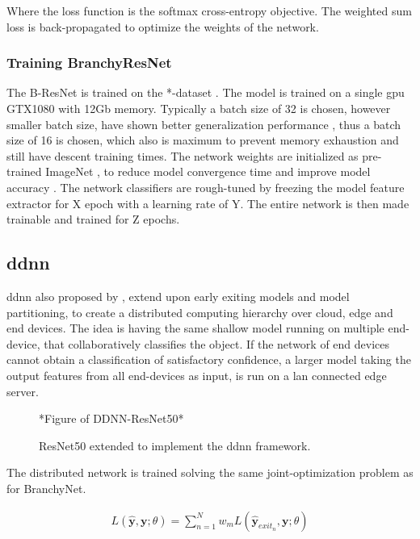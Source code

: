 Where the loss function is the softmax cross-entropy objective.
The weighted sum loss is back-propagated to optimize the weights of the network. 

\subsubsection{Training BranchyResNet}

The B-ResNet is trained on the *-dataset \cite{dataset}. The model is trained on a single \gls{gpu} GTX1080 with 12Gb memory. Typically a batch size of 32 is chosen, however smaller batch size, have shown better generalization performance \cite{masters_revisiting_nodate}, thus a batch size of 16 is chosen, which also is maximum to prevent memory exhaustion and still have descent training times. The network weights are initialized as pre-trained ImageNet \cite{deng_imagenet:_2009}, to reduce model convergence time and improve model accuracy \cite{yosinski_how_2014}. The network classifiers are rough-tuned by freezing the model feature extractor for X epoch with a learning rate of Y. The entire network is then made trainable and trained for Z epochs. 

\subsection{\acrlong{ddnn}}

\gls{ddnn} \cite{teerapittayanon_distributed_2017} also proposed by \citeauthor{teerapittayanon_distributed_2017}, extend upon early exiting models and model partitioning,  to  create a distributed computing hierarchy over cloud, edge and end devices. The idea is having the same shallow model running on multiple end-device, that collaboratively classifies the object. If the network of end devices cannot obtain a classification of satisfactory confidence, a larger model taking the output features from all end-devices as input, is run on a \gls{lan} connected edge server. 

\begin{figure}
	*Figure of DDNN-ResNet50*
	\caption[\gls{ddnn}-ResNet architecture]{ResNet50 extended to implement the \gls{ddnn} framework.}
	\label{ddnn-resnet}
\end{figure}

The distributed network is trained solving the same joint-optimization problem as for BranchyNet.

\begin{align*}
L(\hat{\mathbf{y}},\mathbf{y};\theta) = \sum_{n=1}^{N} w_m L(\hat{\mathbf{y}}_{exit_n},\mathbf{y};\theta)
\end{align*}

